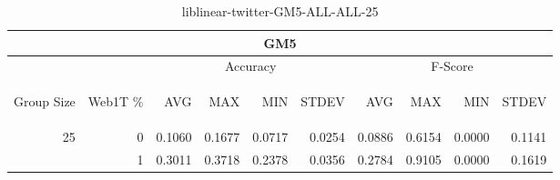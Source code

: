 \begin{center}
\begin{table}[htbp] 
 \begin{center}
\begin{tabular}{ | r | r | r | r | r | r | r | r | r | r |}
\hline
\multicolumn{10}{|c|}{GM5}\\
\hline
 & & \multicolumn{4}{|c|}{Accuracy} & \multicolumn{4}{|c|}{F-Score}\\ \cline{3-10}
\begin{sideways}Group Size\end{sideways} & \begin{sideways}Web1T \%\end{sideways} & \begin{sideways}AVG\end{sideways} & \begin{sideways}MAX\end{sideways} & \begin{sideways}MIN\end{sideways} & \begin{sideways}STDEV\end{sideways} & \begin{sideways}AVG\end{sideways} & \begin{sideways}MAX\end{sideways} & \begin{sideways}MIN\end{sideways} & \begin{sideways}STDEV\end{sideways}\\
\hline
\multirow{1}{*}{25}
 & 0 & 0.1060 & 0.1677 & 0.0717 & 0.0254 & 0.0886 & 0.6154 & 0.0000 & 0.1141\\ \cline{2-10}
 & 1 & 0.3011 & 0.3718 & 0.2378 & 0.0356 & 0.2784 & 0.9105 & 0.0000 & 0.1619\\ \cline{2-10}
\hline
\end{tabular}
\caption{liblinear-twitter-GM5-ALL-ALL-25}
\label{table:liblinear-twitter-GM5-ALL-ALL-25}
\end{center}
 \end{table}
\end{center}

